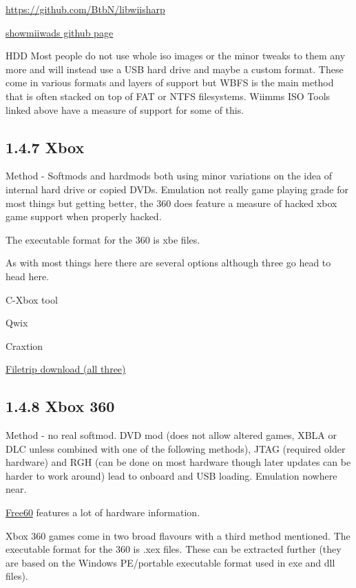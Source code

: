 \documentclass[
]{book}
\begin{document}
\href{http://libwiisharp\%20github\%20page}{https://github.com/BtbN/libwiisharp}

\href{https://github.com/Plombo/showmiiwads}{showmiiwads github page}

HDD Most people do not use whole iso images or the minor tweaks to them any more and will instead use a USB hard drive and maybe a custom format. These come in various formats and layers of support but WBFS is the main method that is often stacked on top of FAT or NTFS filesystems. Wiimms ISO Tools linked above have a measure of support for some of this.

\hypertarget{xbox}{%
\subsection{1.4.7 Xbox}\label{xbox}}

Method - Softmods and hardmods both using minor variations on the idea of internal hard drive or copied DVDs. Emulation not really game playing grade for most things but getting better, the 360 does feature a measure of hacked xbox game support when properly hacked.

The executable format for the 360 is xbe files.

As with most things here there are several options although three go head to head here.

C-Xbox tool

Qwix

Craxtion

\href{http://filetrip.net/oldies-downloads/xbox/iso-hacks-tools/}{Filetrip download (all three)}

\hypertarget{xbox-360}{%
\subsection{1.4.8 Xbox 360}\label{xbox-360}}

Method - no real softmod. DVD mod (does not allow altered games, XBLA or DLC unless combined with one of the following methods), JTAG (required older hardware) and RGH (can be done on most hardware though later updates can be harder to work around) lead to onboard and USB loading. Emulation nowhere near.

\href{http://free60.org/Main_Page}{Free60} features a lot of hardware information.

Xbox 360 games come in two broad flavours with a third method mentioned. The executable format for the 360 is .xex files. These can be extracted further (they are based on the Windows PE/portable executable format used in exe and dll files).
\end{document}
